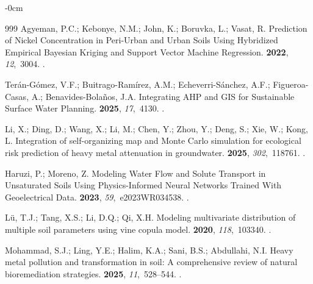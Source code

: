 \documentclass[environremediat,article,accept,pdftex,oneauthor]{Definitions/mdpi}
\begin{document}
\begin{adjustwidth}{-\extralength}{0cm}
\begin{thebibliography}{999}
Agyeman, P.C.; Kebonye, N.M.; John, K.; Boruvka, L.; Vasat, R.
\newblock Prediction of Nickel Concentration in Peri-Urban and Urban Soils
  Using Hybridized Empirical Bayesian Kriging and Support Vector Machine
  Regression.
 {\bf 2022}, {\em 12},~3004.
.

Ter{\'a}n-G{\'o}mez, V.F.; Buitrago-Ram{\'i}rez, A.M.; Echeverri-S{\'a}nchez,
  A.F.; Figueroa-Casas, A.; Benavides-Bola{\~n}os, J.A.
\newblock Integrating AHP and GIS for Sustainable Surface Water Planning.
 {\bf 2025}, {\em 17},~4130.
.

Li, X.; Ding, D.; Wang, X.; Li, M.; Chen, Y.; Zhou, Y.; Deng, S.; Xie, W.; Kong, L.
\newblock Integration of self-organizing map and Monte Carlo simulation for
  ecological risk prediction of heavy metal attenuation in groundwater.
 {\bf 2025}, {\em
  302},~118761.
.

Haruzi, P.; Moreno, Z.
\newblock Modeling Water Flow and Solute Transport in Unsaturated Soils Using
  Physics-Informed Neural Networks Trained With Geoelectrical Data.
 {\bf 2023}, {\em 59},~e2023WR034538.
.

L{\"u}, T.J.; Tang, X.S.; Li, D.Q.; Qi, X.H.
\newblock Modeling multivariate distribution of multiple soil parameters using
  vine copula model.
 {\bf 2020}, {\em 118},~103340.
.

Mohammad, S.J.; Ling, Y.E.; Halim, K.A.; Sani, B.S.; Abdullahi, N.I.
\newblock Heavy metal pollution and transformation in soil: A comprehensive
  review of natural bioremediation strategies.
 {\bf
  2025}, {\em 11},~528--544.
.


\end{thebibliography}
\end{adjustwidth}
\end{document}
